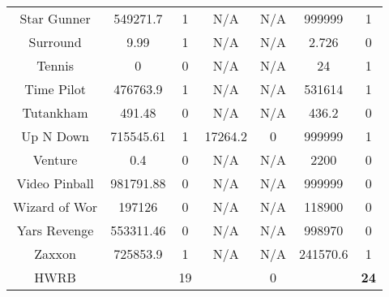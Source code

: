 \begin{table}[!hb]
\begin{center}
\begin{tabular}{c cc cc cc}
        Star Gunner & 549271.7 & 1  & N/A & N/A & 999999 & 1  \\  
        Surround & 9.99 & 1  & N/A & N/A & 2.726 & 0  \\  
        Tennis & 0 & 0  & N/A & N/A & 24 & 1  \\  
        Time Pilot & 476763.9 & 1  & N/A & N/A & 531614 & 1  \\  
        Tutankham & 491.48 & 0  & N/A & N/A & 436.2 & 0  \\  
        Up N Down & 715545.61 & 1  & 17264.2 & 0  & 999999 & 1  \\  
        Venture & 0.4 & 0  & N/A & N/A & 2200 & 0  \\  
        Video Pinball & 981791.88 & 0  & N/A & N/A & 999999 & 0  \\  
        Wizard of Wor & 197126 & 0  & N/A & N/A & 118900 & 0  \\  
        Yars Revenge & 553311.46 & 0  & N/A & N/A & 998970 & 0  \\  
        Zaxxon & 725853.9 & 1  & N/A & N/A & 241570.6 & 1 \\ 
        \midrule
          HWRB & & 19 & & 0 & & \textbf{24} \\
         \bottomrule
\end{tabular}
\end{center}
\end{table}


